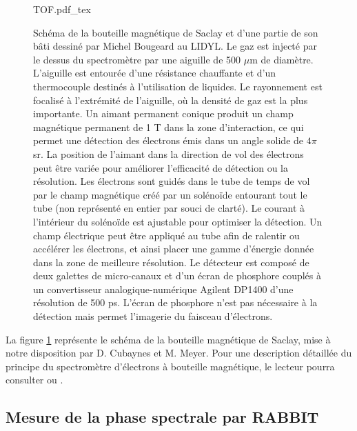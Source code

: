 \begin{figure}
\centering
\def\svgwidth{\columnwidth}
{TOF.pdf_tex}
\caption{Schéma de la bouteille magnétique de Saclay et d'une partie de son bâti dessiné par Michel Bougeard au LIDYL. Le gaz est injecté par le dessus du spectromètre par une aiguille de 500 $\mu$m de diamètre. L'aiguille est entourée d'une résistance chauffante et d'un thermocouple destinés à l'utilisation de liquides. Le rayonnement est focalisé à l'extrémité de l'aiguille, où la densité de gaz est la plus importante. Un aimant permanent conique produit un champ magnétique permanent de 1 T dans la zone d'interaction, ce qui permet une détection des électrons émis dans un angle solide de $4 \pi$ sr. La position de l'aimant dans la direction de vol des électrons peut être variée pour améliorer l'efficacité de détection ou la résolution. Les électrons sont guidés dans le tube de temps de vol par le champ magnétique créé par un solénoïde entourant tout le tube (non représenté en entier par souci de clarté). Le courant à l'intérieur du solénoïde est ajustable pour optimiser la détection. Un champ électrique peut être appliqué au tube afin de ralentir ou accélérer les électrons, et ainsi placer une gamme d'énergie donnée dans la zone de meilleure résolution. Le détecteur est composé de deux galettes de micro-canaux et d'un écran de phosphore couplés à un convertisseur analogique-numérique Agilent DP1400 d'une résolution de 500 ps. L'écran de phosphore n'est pas nécessaire à la détection mais permet l'imagerie du faisceau d'électrons.}
\label{fig:TOF}
\end{figure}

La figure \ref{fig:TOF} représente le schéma de la bouteille magnétique de Saclay, mise à notre disposition par D. Cubaynes et M. Meyer. Pour une description détaillée du principe du spectromètre d'électrons à bouteille magnétique, le lecteur pourra consulter  ou .

\subsection{Mesure de la phase spectrale par RABBIT}
\label{subsec:RABBIT}
